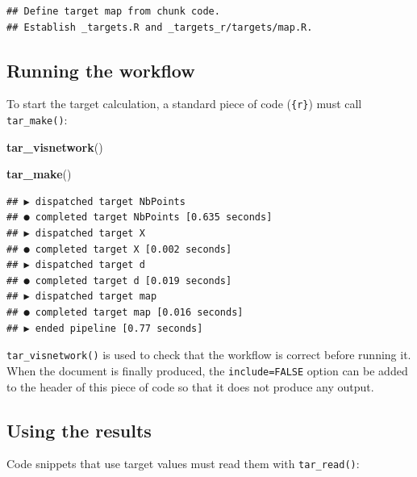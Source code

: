 \documentclass[
  12pt,
  american,
  a4paper,
  extrafontsizes,onecolumn,openright
  ]{memoir}
\newenvironment{Shaded}{\begin{snugshade}}{\end{snugshade}}
\newcommand{\FunctionTok}[1]{\textcolor[rgb]{0.13,0.29,0.53}{\textbf{#1}}}
\newcommand{\NormalTok}[1]{#1}
\begin{document}
\begin{verbatim}
## Define target map from chunk code.
## Establish _targets.R and _targets_r/targets/map.R.
\end{verbatim}

\normalsize

\subsection{Running the workflow}\label{running-the-workflow}

To start the target calculation, a standard piece of code (\texttt{\{r\}}) must call \texttt{tar\_make()}:

\scriptsize

\begin{Shaded}
\begin{Highlighting}[]
\FunctionTok{tar\_visnetwork}\NormalTok{()}
\end{Highlighting}
\end{Shaded}

\begin{Shaded}
\begin{Highlighting}[]
\FunctionTok{tar\_make}\NormalTok{()}
\end{Highlighting}
\end{Shaded}

\begin{verbatim}
## ▶ dispatched target NbPoints
## ● completed target NbPoints [0.635 seconds]
## ▶ dispatched target X
## ● completed target X [0.002 seconds]
## ▶ dispatched target d
## ● completed target d [0.019 seconds]
## ▶ dispatched target map
## ● completed target map [0.016 seconds]
## ▶ ended pipeline [0.77 seconds]
\end{verbatim}

\normalsize

\texttt{tar\_visnetwork()} is used to check that the workflow is correct before running it.
When the document is finally produced, the \texttt{include=FALSE} option can be added to the header of this piece of code so that it does not produce any output.

\subsection{Using the results}\label{using-the-results}

Code snippets that use target values must read them with \texttt{tar\_read()}:

\scriptsize
\end{document}

